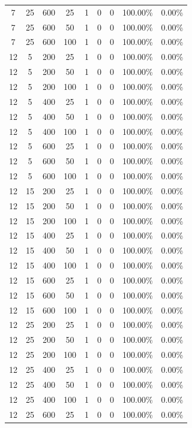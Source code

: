 {\begin{longtable}{| c | c | c | c | c | c | c | c | c |}
7 & 25 & 600 & 25 & 1 & 0 & 0 & 100.00\% & 0.00\% \\
7 & 25 & 600 & 50 & 1 & 0 & 0 & 100.00\% & 0.00\% \\
7 & 25 & 600 & 100 & 1 & 0 & 0 & 100.00\% & 0.00\% \\
12 & 5 & 200 & 25 & 1 & 0 & 0 & 100.00\% & 0.00\% \\
12 & 5 & 200 & 50 & 1 & 0 & 0 & 100.00\% & 0.00\% \\
12 & 5 & 200 & 100 & 1 & 0 & 0 & 100.00\% & 0.00\% \\
12 & 5 & 400 & 25 & 1 & 0 & 0 & 100.00\% & 0.00\% \\
12 & 5 & 400 & 50 & 1 & 0 & 0 & 100.00\% & 0.00\% \\
12 & 5 & 400 & 100 & 1 & 0 & 0 & 100.00\% & 0.00\% \\
12 & 5 & 600 & 25 & 1 & 0 & 0 & 100.00\% & 0.00\% \\
12 & 5 & 600 & 50 & 1 & 0 & 0 & 100.00\% & 0.00\% \\
12 & 5 & 600 & 100 & 1 & 0 & 0 & 100.00\% & 0.00\% \\
12 & 15 & 200 & 25 & 1 & 0 & 0 & 100.00\% & 0.00\% \\
12 & 15 & 200 & 50 & 1 & 0 & 0 & 100.00\% & 0.00\% \\
12 & 15 & 200 & 100 & 1 & 0 & 0 & 100.00\% & 0.00\% \\
12 & 15 & 400 & 25 & 1 & 0 & 0 & 100.00\% & 0.00\% \\
12 & 15 & 400 & 50 & 1 & 0 & 0 & 100.00\% & 0.00\% \\
12 & 15 & 400 & 100 & 1 & 0 & 0 & 100.00\% & 0.00\% \\
12 & 15 & 600 & 25 & 1 & 0 & 0 & 100.00\% & 0.00\% \\
12 & 15 & 600 & 50 & 1 & 0 & 0 & 100.00\% & 0.00\% \\
12 & 15 & 600 & 100 & 1 & 0 & 0 & 100.00\% & 0.00\% \\
12 & 25 & 200 & 25 & 1 & 0 & 0 & 100.00\% & 0.00\% \\
12 & 25 & 200 & 50 & 1 & 0 & 0 & 100.00\% & 0.00\% \\
12 & 25 & 200 & 100 & 1 & 0 & 0 & 100.00\% & 0.00\% \\
12 & 25 & 400 & 25 & 1 & 0 & 0 & 100.00\% & 0.00\% \\
12 & 25 & 400 & 50 & 1 & 0 & 0 & 100.00\% & 0.00\% \\
12 & 25 & 400 & 100 & 1 & 0 & 0 & 100.00\% & 0.00\% \\
12 & 25 & 600 & 25 & 1 & 0 & 0 & 100.00\% & 0.00\% \\

\end{longtable}}
